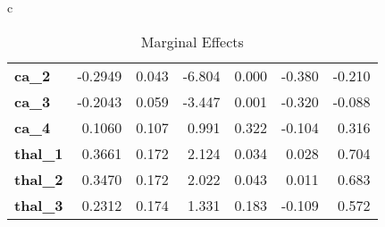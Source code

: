 \begin{table*}[!tp]
{{\begin{tabular}{c}
\begin{tabular*}{\textwidth}{l @{\extracolsep{\fill}} rrrrrr}
\textbf{ca\_2}      &      -0.2949   &        0.043     &    -6.804  &         0.000        &       -0.380    &       -0.210     \\
\textbf{ca\_3}      &      -0.2043   &        0.059     &    -3.447  &         0.001        &       -0.320    &       -0.088     \\
\textbf{ca\_4}      &       0.1060   &        0.107     &     0.991  &         0.322        &       -0.104    &        0.316     \\
\textbf{thal\_1}    &       0.3661   &        0.172     &     2.124  &         0.034        &        0.028    &        0.704     \\
\textbf{thal\_2}    &       0.3470   &        0.172     &     2.022  &         0.043        &        0.011    &        0.683     \\
\textbf{thal\_3}    &       0.2312   &        0.174     &     1.331  &         0.183        &       -0.109    &        0.572     \\

\end{tabular*} \\
    \bottomrule
\end{tabular}
}
}

\caption{Marginal Effects}\label{tab:marginal}
\end{table*}
